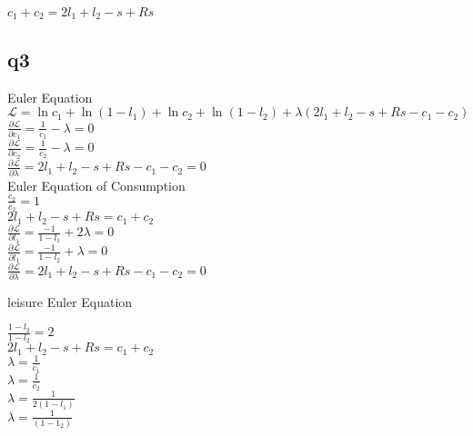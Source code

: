 \documentclass[11pt]{article}
\begin{document}
$c_{1}+c_{2}=2l_{1}+l_{2}-s+Rs$\\


\subsection{q3}
Euler Equation\\

$\mathcal{L}=\ln c_{1}+\ln(1-l_{1}) +\ln c_{2}+\ln(1-l_{2}) +\lambda \left(2l_{1}+l_{2}-s+Rs-c_{1}-c_{2} \right)$\\




$\frac{\partial \mathcal{L}}{\partial c_{1}}=\frac{1}{c_{1}}-\lambda=0$\\


$\frac{\partial \mathcal{L}}{\partial c_{2}}=\frac{1}{c_{2}}-\lambda=0$\\


$\frac{\partial \mathcal{L}}{\partial \lambda}=2l_{1}+l_{2}-s+Rs-c_{1}-c_{2}=0$\\

Euler Equation of Consumption\\

$\frac{c_{2}}{c_{2}}=1$\\

$2l_{1}+l_{2}-s+Rs=c_{1}+c_{2}$\\

$\frac{\partial \mathcal{L}}{\partial l_{1}}=\frac{-1}{1-l_{1}}+2\lambda=0$\\


$\frac{\partial \mathcal{L}}{\partial l_{1}}=\frac{-1}{1-l_{2}}+\lambda=0$\\


$\frac{\partial \mathcal{L}}{\partial \lambda}=2l_{1}+l_{2}-s+Rs-c_{1}-c_{2}=0$

leisure Euler Equation

$\frac{1-l_{2}}{1-l_{2}}=2$\\

$2l_{1}+l_{2}-s+Rs=c_{1}+c_{2}$\\


$\lambda=\frac{1}{c_{1}}$\\

$\lambda=\frac{1}{c_{2}}$\\

$\lambda=\frac{1}{2(1-l_{1})}$\\


$\lambda=\frac{1}{(1-1_{2})}$\\
\end{document}

